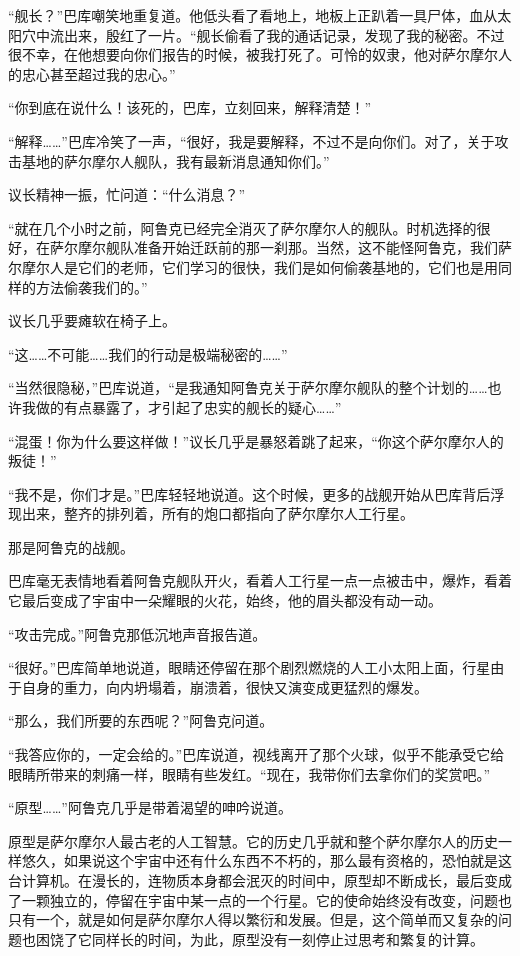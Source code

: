 “舰长？”巴库嘲笑地重复道。他低头看了看地上，地板上正趴着一具尸体，血从太阳穴中流出来，殷红了一片。“舰长偷看了我的通话记录，发现了我的秘密。不过很不幸，在他想要向你们报告的时候，被我打死了。可怜的奴隶，他对萨尔摩尔人的忠心甚至超过我的忠心。” 

“你到底在说什么！该死的，巴库，立刻回来，解释清楚！” 

“解释……”巴库冷笑了一声，“很好，我是要解释，不过不是向你们。对了，关于攻击基地的萨尔摩尔人舰队，我有最新消息通知你们。” 

议长精神一振，忙问道：“什么消息？” 

“就在几个小时之前，阿鲁克已经完全消灭了萨尔摩尔人的舰队。时机选择的很好，在萨尔摩尔舰队准备开始迁跃前的那一刹那。当然，这不能怪阿鲁克，我们萨尔摩尔人是它们的老师，它们学习的很快，我们是如何偷袭基地的，它们也是用同样的方法偷袭我们的。” 

议长几乎要瘫软在椅子上。 

“这……不可能……我们的行动是极端秘密的……” 

“当然很隐秘，”巴库说道，“是我通知阿鲁克关于萨尔摩尔舰队的整个计划的……也许我做的有点暴露了，才引起了忠实的舰长的疑心……” 

“混蛋！你为什么要这样做！”议长几乎是暴怒着跳了起来，“你这个萨尔摩尔人的叛徒！” 

“我不是，你们才是。”巴库轻轻地说道。这个时候，更多的战舰开始从巴库背后浮现出来，整齐的排列着，所有的炮口都指向了萨尔摩尔人工行星。 

那是阿鲁克的战舰。 

巴库毫无表情地看着阿鲁克舰队开火，看着人工行星一点一点被击中，爆炸，看着它最后变成了宇宙中一朵耀眼的火花，始终，他的眉头都没有动一动。 

“攻击完成。”阿鲁克那低沉地声音报告道。 

“很好。”巴库简单地说道，眼睛还停留在那个剧烈燃烧的人工小太阳上面，行星由于自身的重力，向内坍塌着，崩溃着，很快又演变成更猛烈的爆发。 

“那么，我们所要的东西呢？”阿鲁克问道。 

“我答应你的，一定会给的。”巴库说道，视线离开了那个火球，似乎不能承受它给眼睛所带来的刺痛一样，眼睛有些发红。“现在，我带你们去拿你们的奖赏吧。” 

“原型……”阿鲁克几乎是带着渴望的呻吟说道。 

原型是萨尔摩尔人最古老的人工智慧。它的历史几乎就和整个萨尔摩尔人的历史一样悠久，如果说这个宇宙中还有什么东西不不朽的，那么最有资格的，恐怕就是这台计算机。在漫长的，连物质本身都会泯灭的时间中，原型却不断成长，最后变成了一颗独立的，停留在宇宙中某一点的一个行星。它的使命始终没有改变，问题也只有一个，就是如何是萨尔摩尔人得以繁衍和发展。但是，这个简单而又复杂的问题也困饶了它同样长的时间，为此，原型没有一刻停止过思考和繁复的计算。 

